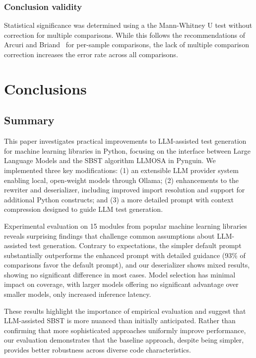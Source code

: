 \documentclass{article}
\begin{document}
\subsubsection{Conclusion validity}
Statistical significance was determined using a the Mann-Whitney U test without correction for multiple comparisons. While this follows the recommendations of Arcuri and Briand~\cite{10.1145/1985793.1985795} for per-sample comparisons, the lack of multiple comparison correction increases the error rate across all comparisons.


\section{Conclusions}\label{sec:conclusion}
\subsection{Summary}

This paper investigates practical improvements to LLM-assisted test generation for machine learning libraries in Python, focusing on the interface between Large Language Models and the SBST algorithm LLMOSA in Pynguin. We implemented three key modifications: (1) an extensible LLM provider system enabling local, open-weight models through Ollama; (2) enhancements to the rewriter and deserializer, including improved import resolution and support for additional Python constructs; and (3) a more detailed prompt with context compression designed to guide LLM test generation.

Experimental evaluation on 15 modules from popular machine learning libraries reveals surprising findings that challenge common assumptions about LLM-assisted test generation. Contrary to expectations, the simpler default prompt substantially outperforms the enhanced prompt with detailed guidance (93\% of comparisons favor the default prompt), and our deserializer shows mixed results, showing no significant difference in most cases. Model selection has minimal impact on coverage, with larger models offering no significant advantage over smaller models, only increased inference latency.

These results highlight the importance of empirical evaluation and suggest that LLM-assisted SBST is more nuanced than initially anticipated. Rather than confirming that more sophisticated approaches uniformly improve performance, our evaluation demonstrates that the baseline approach, despite being simpler, provides better robustness across diverse code characteristics.
\end{document}
